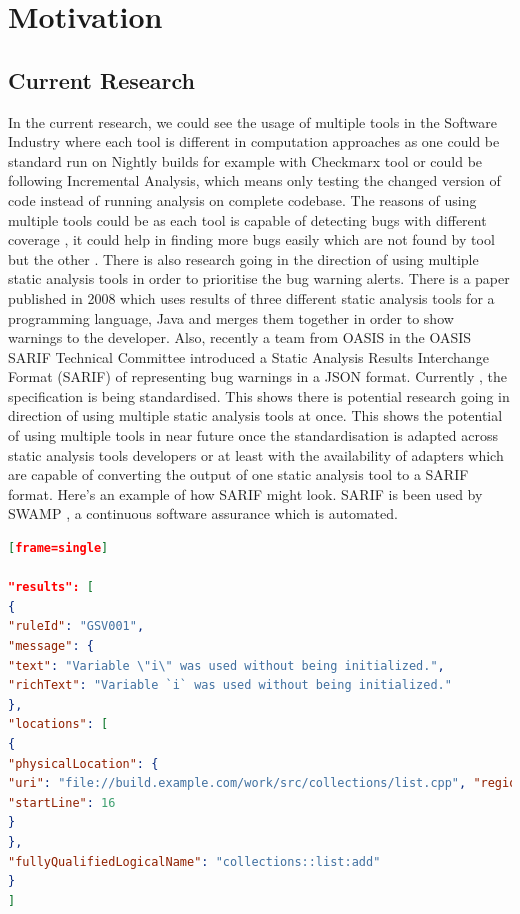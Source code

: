 \chapter{Motivation}
\label{ch:motivation}

\section{Current Research}

In the current research, we could see the usage of multiple tools in the Software Industry where each tool is different in computation approaches as one could be standard run on Nightly builds for example with Checkmarx \cite{checkmarx} tool or could be following Incremental Analysis, which means only testing the changed version of code instead of running analysis on complete codebase. The reasons of using multiple tools could be as each tool is capable of detecting bugs with different coverage \cite{bessey2010few} \cite{delaitre2015evaluating}, it could help in finding more bugs easily which are not found by tool but the other \cite{plakosh2014improving}. There is also research \cite{flynn2018prioritizing} going in the direction of using multiple static analysis tools in order to prioritise the bug warning alerts. There is a paper \cite{meng2008approach} published in 2008 which uses results of three different static analysis tools for a programming language, Java and merges them together in order to show warnings to the developer. Also, recently a team from OASIS \cite{oasis} in the OASIS SARIF Technical Committee \cite{oasis-tc} introduced a Static Analysis Results Interchange Format (SARIF) of representing bug warnings in a JSON format. Currently \cite{sarif-git}, the specification is being standardised. This shows there is potential research going in direction of using multiple static analysis tools at once. This shows the potential of using multiple tools in near future once the standardisation is adapted across static analysis tools developers or at least with the availability of adapters which are capable of converting the output of one static analysis tool to a SARIF format. Here's an example \cite{sarif-example} of how SARIF might look. SARIF is been used by SWAMP \cite{swamp-scarf-sarif}, a continuous software assurance which is automated.

\begin{lstlisting}[language=json,firstnumber=1][frame=single]

"results": [
{
"ruleId": "GSV001",
"message": {
"text": "Variable \"i\" was used without being initialized.",
"richText": "Variable `i` was used without being initialized." 
},
"locations": [
{
"physicalLocation": {
"uri": "file://build.example.com/work/src/collections/list.cpp", "region": {
"startLine": 16
}
},
"fullyQualifiedLogicalName": "collections::list:add"
}
]


\end{lstlisting}


